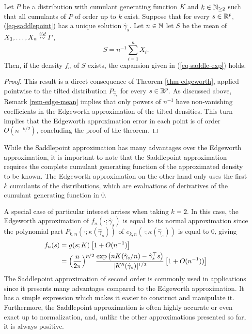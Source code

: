 \begin{theorem}
    Let $P$ be a distribution with cumulant generating function $K$ and $k \in \mathbb{N}_{\geq 2}$ such that all cumulants of $P$ of order up to $k$ exist. Suppose that for every $s \in {\mathbb{R}^p}$, (\ref{eq-saddlepoint}) has a unique solution $\hat\gamma_s$. Let $n \in \mathbb{N}$ let $S$ be the mean of $X_1, \ldots, X_n \stackrel{iid}{\sim} P$,
    \begin{equation*}
        S = n^{-1} \sum_{i=1}^n X_i.
    \end{equation*}
    Then, if the density $f_n$ of $S$ exists, the expansion given in (\ref{eq-saddle-exp}) holds.
\end{theorem}
\begin{proof}
    This result is a direct consequence of Theorem \ref{thm-edgeworth}, applied pointwise to the tilted distribution $P_{\hat\gamma_s}$ for every $s \in {\mathbb{R}^p}$. As discussed above, Remark \ref{rem-edge-mean} implies that only powers of $n^{-1}$ have non-vanishing coefficients in the Edgeworth approximation of the tilted densities. This turn implies that the Edgeworth approximation error in each point is of order $O(n^{-k/2})$, concluding the proof of the theorem.
\end{proof}

While the Saddlepoint approximation has many advantages over the Edgeworth approximation, it is important to note that the Saddlepoint approximation requires the complete cumulant generating function of the approximated density to be known. The Edgeworth approximation on the other hand only uses the first $k$ cumulants of the distributions, which are evaluations of derivatives of the cumulant generating function in 0. 

A special case of particular interest arrises when taking $k = 2$. In this case, the Edgeworth approximation of $f_n(\cdot; \hat\gamma_s)$ is equal to its normal approximation since the polynomial part $P_{k, n}(\cdot; \kappa(\hat\gamma_s))$ of $e_{k,n}(\cdot; \kappa(\hat\gamma_s))$ is equal to 0, giving
\begin{align} \label{eq-saddle-3}
    f_n(s) &= g(s; K)\left[1 + O(n^{-1})\right]\nonumber\\
    &= \left(\frac{n}{2\pi}\right)^{p/2} \frac{\exp\left(nK(\hat\gamma_s / n) - \hat\gamma_s^\top s\right)}{|K''(\hat\gamma_s)|^{1/2}} \left[1 + O(n^{-1}))\right]
\end{align}
The Saddlepoint approximation of second order is commonly used in applications since it presents many advantages compared to the Edgeworth approximation. It has a simple expression which makes it easier to construct and manipulate it. Furthermore, the Saddlepoint approximation is often highly accurate or even exact up to normalization, and, unlike the other approximations presented so far, it is always positive.

